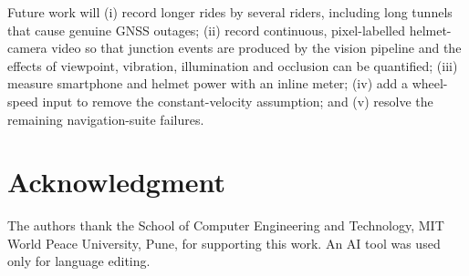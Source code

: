 \documentclass[conference]{IEEEtran}
\begin{document}
Future work will (i) record longer rides by several riders, including long tunnels that cause genuine GNSS outages; (ii) record continuous, pixel-labelled helmet-camera video so that junction events are produced by the vision pipeline and the effects of viewpoint, vibration, illumination and occlusion can be quantified; (iii) measure smartphone and helmet power with an inline meter; (iv) add a wheel-speed input to remove the constant-velocity assumption; and (v) resolve the remaining navigation-suite failures.

\section*{Acknowledgment}

The authors thank the School of Computer Engineering and Technology, MIT World Peace University, Pune, for supporting this work. An AI tool was used only for language editing.



\end{document}

